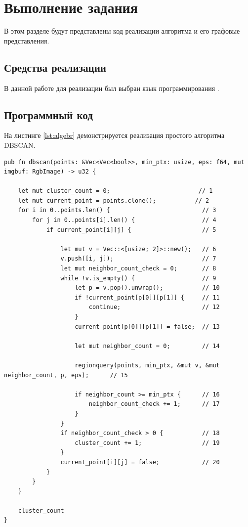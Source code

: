 \chapter{Выполнение задания}

В этом разделе будут представлены код реализации алгоритма и его графовые представления.


\section{Средства реализации}

В данной работе для реализации был выбран язык программирования \cite{python}.

\section{Программный код}

На листинге \ref{lst:algebr} демонстрируется реализация простого алгоритма DBSCAN. 
\newpage

\captionsetup{singlelinecheck = false, justification=raggedright}
\begin{lstlisting}[label=lst:algebr,caption=Реализация простого алгоритма DBSCAN]
pub fn dbscan(points: &Vec<Vec<bool>>, min_ptx: usize, eps: f64, mut imgbuf: RgbImage) -> u32 {
	
	let mut cluster_count = 0;                         // 1
	let mut current_point = points.clone();           // 2                                            
	for i in 0..points.len() {  						// 3
		for j in 0..points[i].len() {					// 4
			if current_point[i][j] {					// 5
				
				let mut v = Vec::<[usize; 2]>::new();  	// 6
				v.push([i, j]);							// 7
				let mut neighbor_count_check = 0;		// 8
				while !v.is_empty() {					// 9
					let p = v.pop().unwrap();			// 10
					if !current_point[p[0]][p[1]] { 	// 11
						continue;						// 12
					}
					current_point[p[0]][p[1]] = false;	// 13
					
					let mut neighbor_count = 0; 		// 14
					
					regionquery(points, min_ptx, &mut v, &mut neighbor_count, p, eps);		// 15
					
					if neighbor_count >= min_ptx {		// 16
						neighbor_count_check += 1;		// 17
					}
				}
				if neighbor_count_check > 0 { 			// 18
					cluster_count += 1;					// 19
				}
				current_point[i][j] = false;			// 20
			}
		}
	}   
	
	cluster_count
}




\end{lstlisting}


